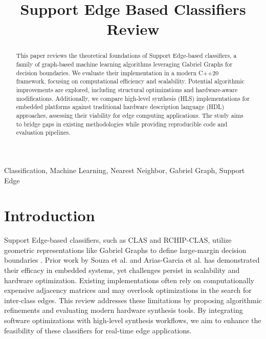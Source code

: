 \documentclass[conference]{IEEEtran}
\begin{document}
\title{Support Edge Based Classifiers Review}

\author{
}

\maketitle

\begin{abstract}
This paper reviews the theoretical foundations of Support Edge-based classifiers, a family of graph-based machine learning algorithms leveraging Gabriel Graphs for decision boundaries. We evaluate their implementation in a modern C++20 framework, focusing on computational efficiency and scalability. Potential algorithmic improvements are explored, including structural optimizations and hardware-aware modifications. Additionally, we compare high-level synthesis (HLS) implementations for embedded platforms against traditional hardware description language (HDL) approaches, assessing their viability for edge computing applications. The study aims to bridge gaps in existing methodologies while providing reproducible code and evaluation pipelines.
\end{abstract}

\begin{IEEEkeywords}
Classification, Machine Learning, Nearest Neighbor, Gabriel Graph, Support Edge
\end{IEEEkeywords}

\section{Introduction}
Support Edge-based classifiers, such as CLAS and RCHIP-CLAS, utilize geometric representations like Gabriel Graphs to define large-margin decision boundaries \cite{torres2016}. Prior work by Souza et al. \cite{souza2019} and Arias-Garcia et al. \cite{arias2021,arias2024} has demonstrated their efficacy in embedded systems, yet challenges persist in scalability and hardware optimization. Existing implementations often rely on computationally expensive adjacency matrices and may overlook optimizations in the search for inter-class edges. This review addresses these limitations by proposing algorithmic refinements and evaluating modern hardware synthesis tools. By integrating software optimizations with high-level synthesis workflows, we aim to enhance the feasibility of these classifiers for real-time edge applications.
\end{document}
